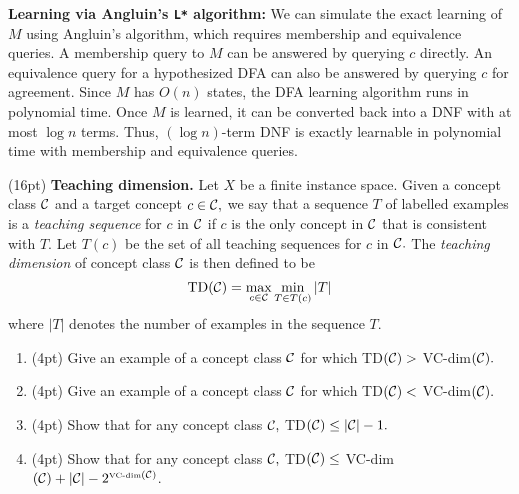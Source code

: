 \documentclass[11pt]{article}
\DeclareMathOperator{\1}{\mathbbm{1}}
\begin{document}
\textbf{Learning via Angluin's \texttt{L*} algorithm:} We can simulate the exact learning of $M$ using Angluin's algorithm, which requires membership and equivalence queries. A membership query to $M$ can be answered by querying $c$ directly. An equivalence query for a hypothesized DFA can also be answered by querying $c$ for agreement. Since $M$ has $O(n)$ states, the DFA learning algorithm runs in polynomial time. Once $M$ is learned, it can be converted back into a DNF with at most $\log n$ terms. Thus, $(\log n)$-term DNF is exactly learnable in polynomial time with membership and equivalence queries.

\begin{problem} (16pt) \textbf{Teaching dimension.} 
Let $X$ be a finite instance space.  Given a concept class ${\cal C}$ and a
target concept $c \in {\cal C},$  we say that a sequence $T$ of labelled
examples is a {\em teaching sequence} for $c$ in ${\cal C}$ if $c$ is the only
concept in ${\cal C}$ that is consistent with $T$. Let $T(c)$ be the set of all
teaching sequences for $c$ in ${\cal C}.$  The {\em teaching dimension} of
concept class ${\cal C}$ is then defined to be
%
\[ \mbox{TD}({\cal C}) = \max_{c \in {\cal C}} \min_{T \in T(c)} |T| \] 
%
where $|T|$ denotes the number of examples in the sequence $T$.
\begin{enumerate}
\item (4pt) Give an example of a concept class ${\cal C}$ for which TD$({\cal C})
> $ VC-dim$({\cal C}).$
\item (4pt) Give an example of a concept class ${\cal C}$ for which TD$({\cal C})
< $ VC-dim$({\cal C}).$
\item (4pt) Show that for any concept class ${\cal C},$ TD$({\cal C}) \leq |{\cal
C}|-1.$
\item (4pt) Show that for any concept class ${\cal C},$ TD$({\cal C}) \leq $
VC-dim$({\cal C}) + |{\cal C}|- 2^{\mbox{\tiny{VC-dim}} ({\cal C})}$.
\end{enumerate}

\end{problem}
\end{document}
